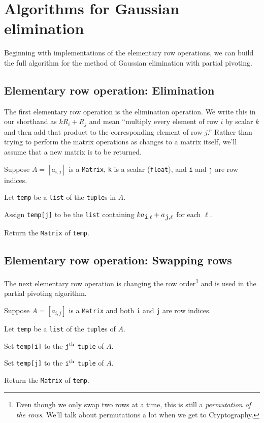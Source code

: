 \documentclass[m3380-lec-main.tex]{subfiles}
\begin{document}
\section{Algorithms for Gaussian elimination} Beginning with implementations of the elementary row operations, we can build the full algorithm for the method of Gaussian elimination with partial pivoting.
\subsection{Elementary row operation: Elimination}
The first elementary row operation is the elimination operation. We write this in our shorthand as $kR_i+R_j$ and mean ``multiply every element of row $i$ by scalar $k$ and then add that product to the corresponding element of row $j$.'' Rather than trying to perform the matrix operations as changes to a matrix itself, we'll assume that a new matrix is to be returned. 

\begin{alg}
Suppose $A=[a_{i,j}]$ is a \verb|Matrix|, \verb|k| is a scalar (\verb|float|), and \verb|i| and \verb|j| are row indices.
\begin{enum}
\item Let \verb|temp| be a \verb|list| of the \verb|tuple|s in $A$.
\item Assign \verb|temp[j]| to be the \verb|list| containing $ka_{\verb|i|,\ell}+a_{\verb|j|,\ell}$ for each $\ell$.
\item Return the \verb|Matrix| of \verb|temp|.
\end{enum}
\end{alg}

\subsection{Elementary row operation: Swapping rows}
The next elementary row operation is changing the row order\footnote{Even though we only swap two rows at a time, this is still a \emph{permutation of the rows}. We'll talk about permutations a lot when we get to Cryptography.} and is used in the partial pivoting algorithm.

\begin{alg} Suppose $A=[a_{i,j}]$ is a \verb|Matrix| and both \verb|i| and \verb|j| are row indices.
\begin{enum}
\item Let \verb|temp| be a \verb|list| of the \verb|tuple|s of $A$.
\item Set \verb|temp[i]| to the $\verb|j|^\text{th}$ \verb|tuple| of $A$.
\item Set \verb|temp[j]| to the $\verb|i|^\text{th}$ \verb|tuple| of $A$.
\item Return the \verb|Matrix| of \verb|temp|.
\end{enum}
\end{alg}
\end{document}
